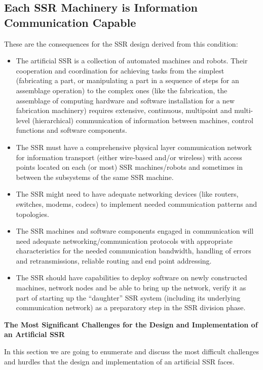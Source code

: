 \subsection[Each SSR Machinery is Information Communication
Capable]{Each SSR Machinery is Information Communication Capable}
\hypertarget{RefHeading3134306210128}{}These are the consequences for
the SSR design derived from this condition:


\bigskip

\begin{itemize}
\item The artificial SSR is a collection of automated machines and
robots. Their cooperation and coordination for achieving tasks from the
simplest (fabricating a part, or manipulating a part in a sequence of
steps for an assemblage operation) to the complex ones (like the
fabrication, the assemblage of computing hardware and software
installation for a new fabrication machinery) requires extensive,
continuous, multipoint and multi-level (hierarchical) communication of
information between machines, control functions and software
components.
\item The SSR must have a comprehensive physical layer communication
network for information transport (either wire-based and/or wireless)
with access points located on each (or most) SSR machines/robots and
sometimes in between the subsystems of the same SSR machine.
\item The SSR might need to have adequate networking devices (like
routers, switches, modems, codecs) to implement needed communication
patterns and topologies.
\item The SSR machines and software components engaged in communication
will need adequate networking/communication protocols with appropriate
characteristics for the needed communication bandwidth, handling of
errors and retransmissions, reliable routing and end point addressing.
\item The SSR should have capabilities to deploy software on newly
constructed machines, network nodes and be able to bring up the
network, verify it as part of starting up the “daughter” SSR system
(including its underlying communication network) as a preparatory step
in the SSR division phase.
\end{itemize}
{\bfseries
\hypertarget{RefHeading3136306210128}{}The Most Significant Challenges
for the Design and Implementation of an Artificial SSR}

In this section we are going to enumerate and discuss the most difficult
challenges and hurdles that the design and implementation of an
artificial SSR faces.


